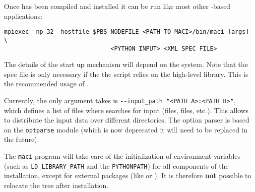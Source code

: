 
Once \MACI has been compiled and installed it can be run like most other \MPI-based applications:
\begin{lstlisting}[style=SHELL]
mpiexec -np 32 -hostfile $PBS_NODEFILE <PATH TO MACI>/bin/maci [args] \
                              <PYTHON INPUT> <XML SPEC FILE>
\end{lstlisting}
The details of the \MPI start up mechanism will depend on the system. Note that the \XML spec file is only necessary if the the \PYTHON script relies on the high-level \PYTHON library. This is the recommended usage of \MACI. 

Currently, the only argument \MACI takes is \lstinline[style=SHELL]|--input_path "<PATH A>:<PATH B>"|, which defines a list of files where \MACI searches for input (\XML files, \PYTHON files, etc.). This allows to distribute the input data over different directories. The option parser is based on the \lstinline[style=CODE]|optparse| module (which is now deprecated it will need to be replaced in the future).

The \lstinline[style=SHELL]|maci| program will take care of the initialization of environment variables (such as \lstinline[style=SHELL]|LD_LIBRARY_PATH| and the \lstinline[style=SHELL]|PYTHONPATH|) for all components of the installation, except for external packages (like \TRILINOS or \PETSC). It is therefore \textbf{not} possible to relocate the \MACI tree after installation. 
